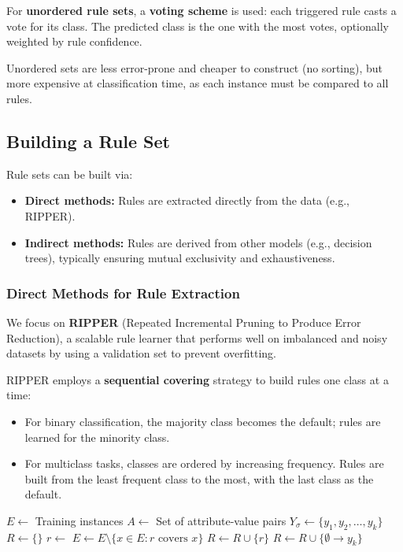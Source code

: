 For \textbf{unordered rule sets}, a \textbf{voting scheme} is used: each triggered rule casts a vote for its class. The predicted class is the one with the most votes, optionally weighted by rule confidence.

Unordered sets are less error-prone and cheaper to construct (no sorting), but more expensive at classification time, as each instance must be compared to all rules.

\subsection{Building a Rule Set}

Rule sets can be built via:
\begin{itemize}
    \item \textbf{Direct methods:} Rules are extracted directly from the data (e.g., RIPPER).
    \item \textbf{Indirect methods:} Rules are derived from other models (e.g., decision trees), typically ensuring mutual exclusivity and exhaustiveness.
\end{itemize}

\subsubsection{Direct Methods for Rule Extraction}

We focus on \textbf{RIPPER} (Repeated Incremental Pruning to Produce Error Reduction), a scalable rule learner that performs well on imbalanced and noisy datasets by using a validation set to prevent overfitting.

RIPPER employs a \textbf{sequential covering} strategy to build rules one class at a time:
\begin{itemize}
    \item For binary classification, the majority class becomes the default; rules are learned for the minority class.
    \item For multiclass tasks, classes are ordered by increasing frequency. Rules are built from the least frequent class to the most, with the last class as the default.
\end{itemize}

\begin{algorithm}
\caption{Sequential Covering Algorithm}
\begin{algorithmic}[1]
    \State $E \gets$ Training instances
    \State $A \gets$ Set of attribute-value pairs
    \State $Y_{\sigma} \gets \{y_1, y_2, \dots, y_k\}$ 
    \State $R \gets \{\}$ 
            \State $r \gets$ 
            \State $E \gets E \setminus \{x \in E : r \text{ covers } x\}$
            \State $R \gets R \cup \{r\}$
        \EndWhile
    \EndFor
    \State $R \gets R \cup \{\emptyset \rightarrow y_k\}$ 
\end{algorithmic}
\end{algorithm}

